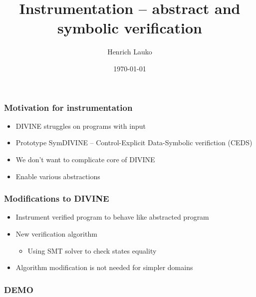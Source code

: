 \documentclass[xcolor=dvipsnames]{beamer}
\title{Instrumentation -- abstract and symbolic verification}
\author{Henrich Lauko \vspace{-0.3cm}}
\institute{FAKOS 2017 \vspace{1cm}}
\date{\today}
\let\otp\titlepage
\renewcommand{\titlepage}{\otp\addtocounter{framenumber}{-1}}
\begin{document}
\begin{frame}[plain]
 \titlepage
\end{frame}

\begin{frame}
  \frametitle{Motivation for instrumentation}
    \begin{itemize}
        \item DIVINE struggles on programs with input
        \item Prototype SymDIVINE -- Control-Explicit Data-Symbolic verifiction (CEDS)
        \item We don't want to complicate core of DIVINE
        \item Enable various abstractions
    \end{itemize}
\end{frame}

\begin{frame}
  \frametitle{Modifications to DIVINE}
    \begin{itemize}
        \item Instrument verified program to behave like abstracted program
        \item New verification algorithm
        \begin{itemize}
            \item Using SMT solver to check states equality
        \end{itemize}
        \item Algorithm modification is not needed for simpler domains
    \end{itemize}
\end{frame}

\begin{frame}
  \frametitle{DEMO}
\end{frame}
\end{document}
